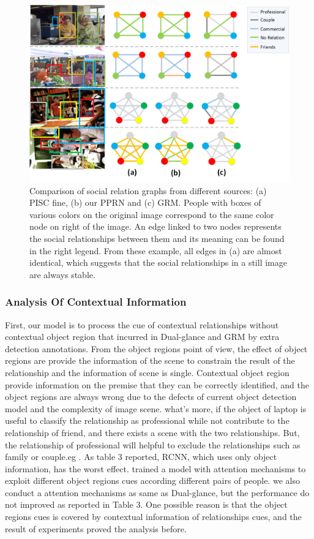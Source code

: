 \documentclass{article}
\newcommand{\PPRN}{{\sf PPRN}}
\begin{document}
\begin{figure}[ht]
  \centering
  \includegraphics[width=0.9\linewidth]{pic/case_study_pisc_fine_union.png}
  \caption{Comparison of social relation graphs from different sources: (a) PISC fine, (b) our {\PPRN}  and (c) GRM. People with boxes of various colors on the original image correspond to the same color node on right of the image. An edge linked to two nodes represents the social relationships between them and its meaning can be found in the right legend. From these example, all edges in (a) are almost identical, which suggests that the social relationships in a still image are always stable.}
  \label{fig:case_study}
\end{figure}

\subsubsection{Analysis Of Contextual Information}

First, our model is to process the cue of contextual relationships without contextual object region that incurred in Dual-glance and GRM by extra detection annotations.
From the object regions point of view, the effect of object regions are provide the information of the scene to constrain the result of the relationship and the information of scene is single. 
Contextual object region provide information on the premise that they can be correctly identified, and the object regions are always wrong due to the defects of current object detection model and the complexity of image scene.
what's more, if the object of laptop is useful to classify the relationship as professional while not contribute to the relationship of friend, and there exists a scene with the two relationships. But, the relationship of professional will helpful to exclude the relationships such as family or couple.eg .
As table 3 reported, RCNN, which uses only object information, has the worst effect. \cite{DBLP:conf/iccv/LiWZK17} trained a model with attention mechanisms to exploit different object regions cues according different pairs of people. we also conduct a attention mechanisms as same as Dual-glance, but the performance do not improved as reported in Table 3.
One possible reason is that the object regions cues is covered by contextual information of relationships cues, and the result of experiments proved the analysis before.
\end{document}
